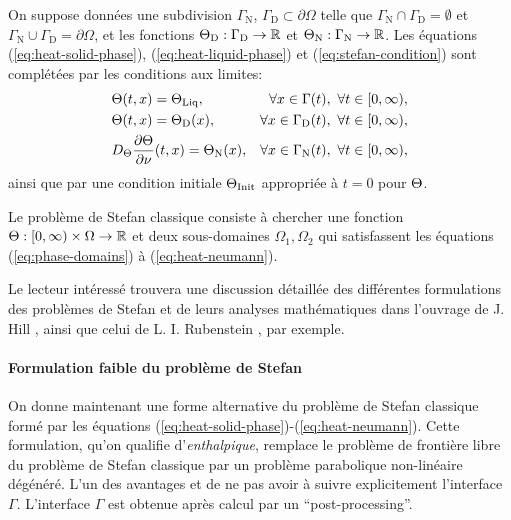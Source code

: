On suppose données une subdivision $\Gamma_\mathrm{N}$,
$\Gamma_\mathrm{D}\subset \partial \Omega$ telle que
$\Gamma_\mathrm{N}\cap \Gamma_\mathrm{D} = \emptyset$ et
$\Gamma_\mathrm{N}\cup \Gamma_\mathrm{D} = \partial \Omega$, et les
fonctions $\Theta_\mathrm{D}:\Gamma_\mathrm{D}\to\mathbb R$ et
$\Theta_\mathrm{N}:\Gamma_\mathrm{N}\to\mathbb R$. Les équations
(\ref{eq:heat-solid-phase}), (\ref{eq:heat-liquid-phase}) et
(\ref{eq:stefan-condition}) sont complétées par les conditions aux
limites:
\begin{align}
  &\temperature(t, x) = \tliq, %
  &\forall x \in \Gamma(t),\ \forall t \in [0,\infty),\label{eq:heat-transition}\\
  &\temperature(t, x) = \temperature_\mathrm{D}(x), %
  &\forall x \in \Gamma_\mathrm{D}(t),\ \forall t \in [0,\infty),\label{eq:heat-dirichlet}\\
  &\electrolytetdiff\frac{\partial \temperature}{\partial \nu}(t, x) = \temperature_\mathrm{N}(x), %
  &\forall x \in \Gamma_\mathrm{N}(t),\ \forall t \in [0,\infty),\label{eq:heat-neumann}
\end{align}
ainsi que par une condition initiale $\Theta_\text{Init}$ appropriée à $t = 0$ pour
$\Theta$.

Le problème de Stefan classique consiste à chercher une fonction
$\Theta:[0,\infty)\times\Omega\to\mathbb R$ et deux
  sous-domaines $\Omega_1,\Omega_2$ qui satisfassent les équations
  (\ref{eq:phase-domains}) à (\ref{eq:heat-neumann}).

Le lecteur intéressé trouvera une discussion détaillée des différentes
formulations des problèmes de Stefan et de leurs analyses
mathématiques dans l'ouvrage de J. Hill \cite{HillStefanProblems},
ainsi que celui de L. I. Rubenstein \cite{Rubenstein1971}, par
exemple.

\paragraph{Formulation faible du problème de Stefan}
On donne maintenant une forme alternative du problème de Stefan
classique formé par les équations
(\ref{eq:heat-solid-phase})-(\ref{eq:heat-neumann}). Cette
formulation, qu'on qualifie d'{\em enthalpique},
remplace le problème de frontière libre du problème de Stefan
classique par un problème parabolique non-linéaire dégénéré. L'un des
avantages et de ne pas avoir à suivre explicitement l'interface
$\Gamma$. L'interface $\Gamma$ est obtenue après calcul par un
``post-processing''.

